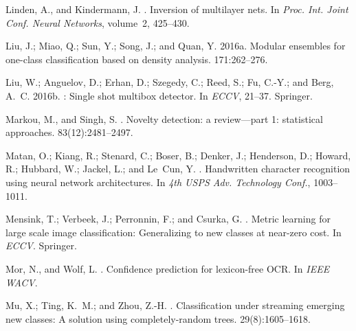 \documentclass[letterpaper]{article}
\begin{document}
\begin{thebibliography}{}
Linden, A., and Kindermann, J.
.
\newblock Inversion of multilayer nets.
\newblock In {\em Proc. Int. Joint Conf. Neural Networks}, volume~2,  425--430.

Liu, J.; Miao, Q.; Sun, Y.; Song, J.; and Quan, Y.
\newblock 2016a.
\newblock Modular ensembles for one-class classification based on density
  analysis.
 171:262--276.

Liu, W.; Anguelov, D.; Erhan, D.; Szegedy, C.; Reed, S.; Fu, C.-Y.; and Berg,
  A.~C.
\newblock 2016b.
: Single shot multibox detector.
\newblock In {\em ECCV},  21--37.
\newblock Springer.

Markou, M., and Singh, S.
.
\newblock Novelty detection: a review—part 1: statistical approaches.
 83(12):2481--2497.

Matan, O.; Kiang, R.; Stenard, C.; Boser, B.; Denker, J.; Henderson, D.;
  Howard, R.; Hubbard, W.; Jackel, L.; and Le~Cun, Y.
.
\newblock Handwritten character recognition using neural network architectures.
\newblock In {\em 4th USPS Adv. Technology Conf.},  1003--1011.

Mensink, T.; Verbeek, J.; Perronnin, F.; and Csurka, G.
.
\newblock Metric learning for large scale image classification: Generalizing to
  new classes at near-zero cost.
\newblock In {\em ECCV}. Springer.

Mor, N., and Wolf, L.
.
\newblock Confidence prediction for lexicon-free {OCR}.
\newblock In {\em IEEE WACV}.

Mu, X.; Ting, K.~M.; and Zhou, Z.-H.
.
\newblock Classification under streaming emerging new classes: {A} solution
  using completely-random trees.
 29(8):1605--1618.


\end{thebibliography}
\end{document}
